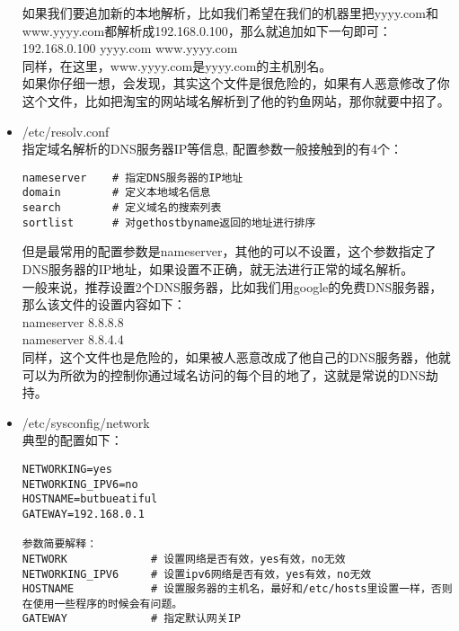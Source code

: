 \begin{itemize}
如果我们要追加新的本地解析，比如我们希望在我们的机器里把yyyy.com和www.yyyy.com都解析成192.168.0.100，那么就追加如下一句即可：\\
192.168.0.100 yyyy.com www.yyyy.com\\
同样，在这里，www.yyyy.com是yyyy.com的主机别名。\\
如果你仔细一想，会发现，其实这个文件是很危险的，如果有人恶意修改了你这个文件，比如把淘宝的网站域名解析到了他的钓鱼网站，那你就要中招了。


\item{/etc/resolv.conf}\\
指定域名解析的DNS服务器IP等信息, 配置参数一般接触到的有4个：\\
\begin{verbatim}
nameserver    # 指定DNS服务器的IP地址
domain        # 定义本地域名信息
search        # 定义域名的搜索列表
sortlist      # 对gethostbyname返回的地址进行排序
\end{verbatim}
但是最常用的配置参数是nameserver，其他的可以不设置，这个参数指定了DNS服务器的IP地址，如果设置不正确，就无法进行正常的域名解析。\\
一般来说，推荐设置2个DNS服务器，比如我们用google的免费DNS服务器，那么该文件的设置内容如下：\\
nameserver 8.8.8.8\\
nameserver 8.8.4.4\\
同样，这个文件也是危险的，如果被人恶意改成了他自己的DNS服务器，他就可以为所欲为的控制你通过域名访问的每个目的地了，这就是常说的DNS劫持。


\item{/etc/sysconfig/network}\\
典型的配置如下：
\begin{verbatim}
NETWORKING=yes
NETWORKING_IPV6=no
HOSTNAME=butbueatiful
GATEWAY=192.168.0.1

参数简要解释：
NETWORK             # 设置网络是否有效，yes有效，no无效
NETWORKING_IPV6     # 设置ipv6网络是否有效，yes有效，no无效
HOSTNAME            # 设置服务器的主机名，最好和/etc/hosts里设置一样，否则在使用一些程序的时候会有问题。
GATEWAY             # 指定默认网关IP
\end{verbatim}


\end{itemize}
